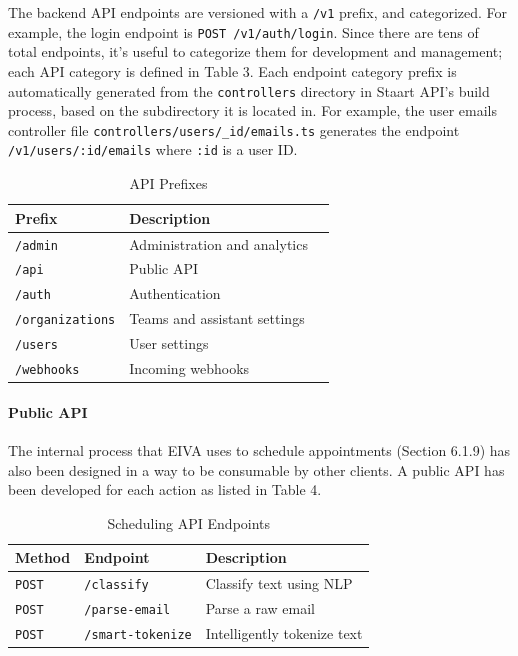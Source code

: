 \documentclass{article}
\begin{document}
The backend API endpoints are versioned with a \texttt{/v1} prefix, and categorized. For example, the login endpoint is \texttt{POST /v1/auth/login}.  Since there are tens of total endpoints, it's useful to categorize them for development and management; each API category is defined in Table 3. Each endpoint category prefix is automatically generated from the \texttt{controllers} directory in Staart API's build process, based on the subdirectory it is located in. For example, the user emails controller file \texttt{controllers/users/\_id/emails.ts} generates the endpoint \texttt{/v1/users/:id/emails} where \texttt{:id} is a user ID.

\begin{table}[!htb]
	\begin{minipage}{1\linewidth}
		\caption{API Prefixes}
		\centering
		\begin{tabular}{lll}
			\hline
			\textbf{Prefix} & \textbf{Description} \\
			\hline
			\texttt{/admin} & Administration and analytics \\
			\texttt{/api} & Public API \\
			\texttt{/auth} & Authentication \\
			\texttt{/organizations} & Teams and assistant settings \\
			\texttt{/users} & User settings \\
			\texttt{/webhooks} & Incoming webhooks \\
			\hline
		\end{tabular}
	\end{minipage}%
\end{table}

\paragraph{Public API}

The internal process that EIVA uses to schedule appointments (Section 6.1.9) has also been designed in a way to be consumable by other clients. A public API has been developed for each action as listed in Table 4.

\begin{table}[!htb]
	\begin{minipage}{1\linewidth}
		\caption{Scheduling API Endpoints}
		\centering
		\begin{tabular}{lll}
			\hline
			\textbf{Method} & \textbf{Endpoint} & \textbf{Description} \\
			\hline
			\texttt{POST} & \texttt{/classify} & Classify text using NLP \\
			\texttt{POST} & \texttt{/parse-email} & Parse a raw email \\
			\texttt{POST} & \texttt{/smart-tokenize} & Intelligently tokenize text \\
			\hline
		\end{tabular}
	\end{minipage}%
\end{table}
\end{document}
